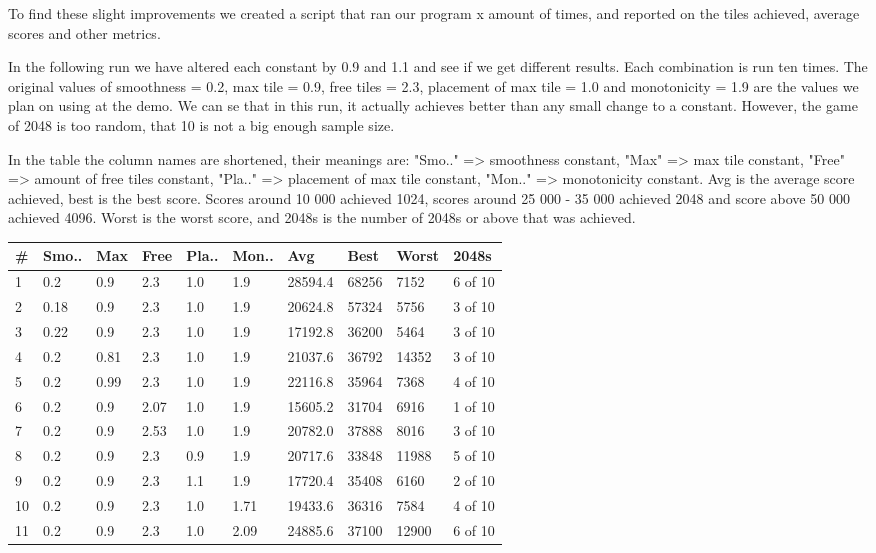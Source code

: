 To find these slight improvements we created a script that ran our program x amount of
times, and reported on the tiles achieved, average scores and other metrics.

In the following run we have altered each constant by 0.9 and 1.1 and see if we
get different results. Each combination is run ten times. The original values
of smoothness = 0.2, max tile = 0.9, free tiles = 2.3, placement of max tile = 1.0
and monotonicity = 1.9 are the values we plan on using at the demo. We can se
that in this run, it actually achieves better than any small change to a constant.
However, the game of 2048 is too random, that 10 is not a big enough sample size.

In the table the column names are shortened, their meanings are: "Smo.." => smoothness
constant, "Max" => max tile constant, "Free" => amount of free tiles constant,
"Pla.." => placement of max tile constant, "Mon.." => monotonicity constant. Avg is the
average score achieved, best is the best score. Scores around 10 000 achieved 1024,
scores around 25 000 - 35 000 achieved 2048 and score above 50 000 achieved 4096.
Worst is the worst score, and 2048s is the number of 2048s or above that was achieved.

\begin{center}
    \begin{tabular}{ | l | l | l | l | l | l | l | l | l | l | }
    \hline
    \# & Smo.. & Max & Free & Pla.. & Mon.. & Avg & Best & Worst & 2048s \\  \hline \hline
    1 & 0.2 & 0.9 & 2.3 &  1.0 & 1.9 & 28594.4 & 68256 & 7152 & 6 of 10 \\ \hline \hline
    2 & 0.18 & 0.9 & 2.3 &  1.0 & 1.9 & 20624.8 & 57324 & 5756 & 3 of 10 \\ \hline
    3 & 0.22 & 0.9 & 2.3 &  1.0 & 1.9 & 17192.8 & 36200 & 5464 & 3 of 10 \\ \hline
    4 & 0.2 & 0.81 & 2.3 &  1.0 & 1.9 & 21037.6 & 36792 & 14352 & 3 of 10 \\ \hline
    5 & 0.2 & 0.99 & 2.3 &  1.0 & 1.9 & 22116.8 & 35964 & 7368 & 4 of 10 \\ \hline
    6 & 0.2 & 0.9 & 2.07 &  1.0 & 1.9 & 15605.2 & 31704 & 6916 & 1 of 10 \\ \hline
    7 & 0.2 & 0.9 & 2.53 &  1.0 & 1.9 & 20782.0 & 37888 & 8016 & 3 of 10 \\ \hline
    8 & 0.2 & 0.9 & 2.3 &  0.9 & 1.9 & 20717.6 & 33848 & 11988 & 5 of 10 \\ \hline
    9 & 0.2 & 0.9 & 2.3 &  1.1 & 1.9 & 17720.4 & 35408 & 6160 & 2 of 10 \\ \hline
    10 & 0.2 & 0.9 & 2.3 &  1.0 & 1.71 & 19433.6 & 36316 & 7584 & 4 of 10 \\ \hline
    11 & 0.2 & 0.9 & 2.3 &  1.0 & 2.09 & 24885.6 & 37100 & 12900 & 6 of 10 \\ \hline
    \end{tabular}
\end{center}

